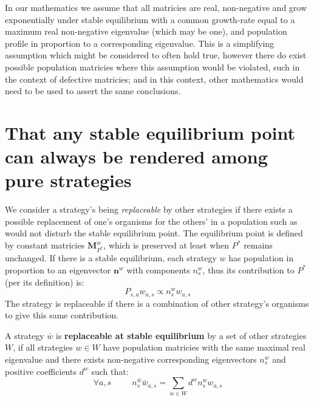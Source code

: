 In our mathematics we assume that all matricies are real, non-negative and grow exponentially under stable equilibrium with a common growth-rate equal to a maximum real non-negative eigenvalue (which may be one), and population profile in proportion to a corresponding eigenvalue.
This is a simplifying assumption which might be considered to often hold true, however there do exist possible population matricies where this assumption would be violated, such in the context of defective matricies; and in this context, other mathematics would need to be used to assert the same conclusions.

\section{That any stable equilibrium point can always be rendered among pure strategies}\label{appendix5}
We consider a strategy's being \textit{replaceable} by other strategies if there exists a possible replacement of one's organisms for the others' in a population such as would not disturb the stable equilibrium point. The equilibrium point is defined by constant matricies $\mathbf{M}_{P^*}^w$, which is preserved at least when $P^*$ remains unchanged.
If there is a stable equilibrium, each strategy $w$ has population in proportion to an eigenvector $\mathbf{n}^w$ with components $n^w_s$, thus its contribution to $P^*$ (per its definition) is:
$$P_{s,a}w_{a,s} \propto n^w_sw_{a,s}$$
The strategy is replaceable if there is a combination of other strategy's organisms to give this same contribution.

\begin{Definition}\label{def1}
A strategy $\bar{w}$ is \textbf{replaceable at stable equilibrium} by a set of other strategies $W$, if all strategies $w\in W$ have population matricies with the same maximal real eigenvalue and there exists non-negative corresponding eigenvectors $n^w_s$ and positive coefficients $d^w$ such that:
$$\forall a,s~~~~~~~~~~~ n^{\bar{w}}_s\bar{w}_{a,s} = \sum_{w\in W}d^wn^w_sw_{a,s} $$
\end{Definition}



